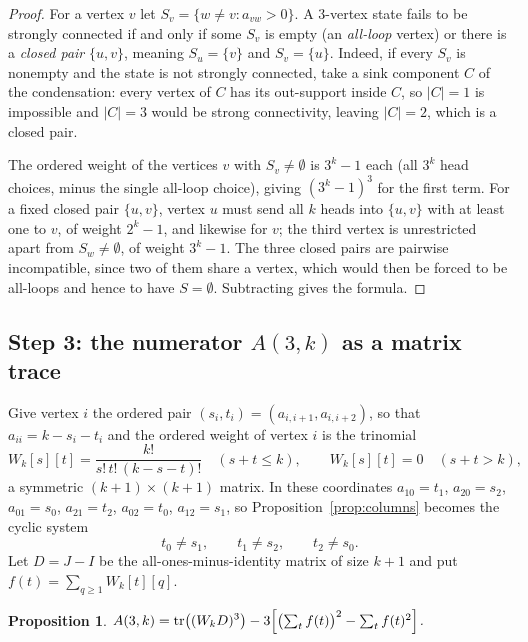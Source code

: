 \documentclass[11pt]{amsart}
\newtheorem{proposition}[theorem]{Proposition}
\theoremstyle{remark}
\begin{document}
\begin{proof}
For a vertex $v$ let $S_v=\{w\neq v: a_{vw}>0\}$.  A $3$-vertex state fails to be strongly
connected if and only if some $S_v$ is empty (an \emph{all-loop} vertex) or there is a
\emph{closed pair} $\{u,v\}$, meaning $S_u=\{v\}$ and $S_v=\{u\}$.  Indeed, if every $S_v$
is nonempty and the state is not strongly connected, take a sink component $C$ of the
condensation: every vertex of $C$ has its out-support inside $C$, so $|C|=1$ is impossible
and $|C|=3$ would be strong connectivity, leaving $|C|=2$, which is a closed pair.

The ordered weight of the vertices $v$ with $S_v\neq\emptyset$ is $3^k-1$ each (all $3^k$
head choices, minus the single all-loop choice), giving $(3^k-1)^3$ for the first term.
For a fixed closed pair $\{u,v\}$, vertex $u$ must send all $k$ heads into $\{u,v\}$ with
at least one to $v$, of weight $2^k-1$, and likewise for $v$; the third vertex is
unrestricted apart from $S_w\neq\emptyset$, of weight $3^k-1$.  The three closed pairs are
pairwise incompatible, since two of them share a vertex, which would then be forced to be
all-loops and hence to have $S=\emptyset$.  Subtracting gives the formula.
\end{proof}

\subsection*{Step 3: the numerator $A(3,k)$ as a matrix trace}

Give vertex $i$ the ordered pair $(s_i,t_i)=(a_{i,i+1},a_{i,i+2})$, so that
$a_{ii}=k-s_i-t_i$ and the ordered weight of vertex $i$ is the trinomial
\[
  W_k[s][t]=\frac{k!}{s!\,t!\,(k-s-t)!}\quad(s+t\le k),
  \qquad W_k[s][t]=0\quad(s+t>k),
\]
a symmetric $(k+1)\times(k+1)$ matrix.  In these coordinates $a_{10}=t_1$, $a_{20}=s_2$,
$a_{01}=s_0$, $a_{21}=t_2$, $a_{02}=t_0$, $a_{12}=s_1$, so
Proposition~\ref{prop:columns} becomes the cyclic system
\begin{equation}\label{eq:cycle}
  t_0\neq s_1,
  \qquad
  t_1\neq s_2,
  \qquad
  t_2\neq s_0 .
\end{equation}
Let $D=J-I$ be the all-ones-minus-identity matrix of size $k+1$ and put $f(t)=\sum_{q\ge1}W_k[t][q]$.

\begin{proposition}\label{prop:A}
$\displaystyle A(3,k)=\operatorname{tr}\bigl((W_kD)^3\bigr)-3\Bigl[\bigl(\textstyle\sum_tf(t)\bigr)^2-\sum_tf(t)^2\Bigr]$.
\end{proposition}
\end{document}
